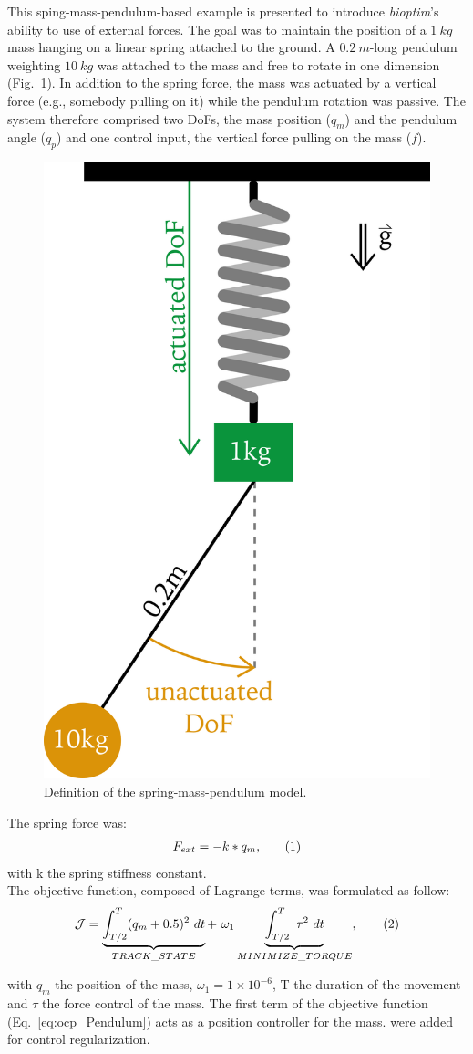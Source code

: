 This sping-mass-pendulum-based example is presented to introduce \textit{bioptim}'s ability to use of external forces.
The goal was to maintain the position of a $\SI{1}{kg}$ mass hanging on a linear spring attached to the ground.
A $\SI{0.2}{m}$-long pendulum weighting $\SI{10}{kg}$ was attached to the mass and free to rotate in one dimension (Fig.~\ref{fig:Mass_Pendulum_Model}).
In addition to the spring force, the mass was actuated by a vertical force (e.g., somebody pulling on it) while the pendulum rotation was passive.
The system therefore comprised two DoFs, the mass position ($q_m$) and the pendulum angle ($q_p$) and one control input, the vertical force pulling on the mass ($f$). 
\begin{figure}[h!]
\centering
\includegraphics[width=0.35\columnwidth]{figures/Mass_Pendulum_Model.png}
\caption{Definition of the spring-mass-pendulum model.}
\label{fig:Mass_Pendulum_Model}
\end{figure}
The spring force was:
\[
\begin{aligned}
F_{ext} = -k*q_m,
\end{aligned}
\addtag
\label{eq:f_ext}
\]
with k the spring stiffness constant.\\
The objective function, composed of Lagrange terms, was formulated as follow:
\[
\mathcal{J} = \underbrace{\int_{T/2}^T (q_m + 0.5)^2~dt}_{TRACK\_STATE}  +~\omega_1 \underbrace{\int_{T/2}^T ~\tau^2~dt}_{MINIMIZE\_ TORQUE},
\addtag
\label{eq:ocp_Pendulum}
\]

\noindent with $q_m$ the position of the mass, $\omega_1 = 1\times 10^{-6}$, T the duration of the movement and $\tau$ the force control of the mass.
The first term of the objective function (Eq.~\ref{eq:ocp_Pendulum}) acts as a position controller for the mass.
 were added for control regularization.

